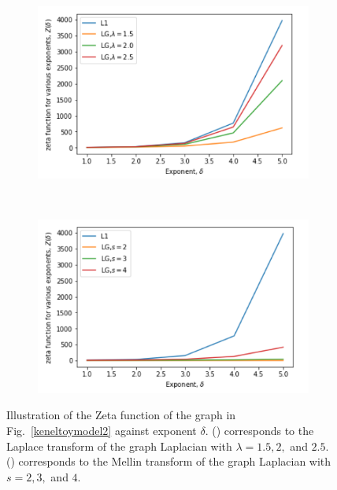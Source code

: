 \documentclass[10pt,a4paper]{article}
\begin{document}
      \begin{figure}[H]
      	\centering
      	\begin{subfigure}[b]{0.35\textwidth}
      		\includegraphics[width= \textwidth]{images/zeta-laplace2.png}
      		\caption{}
      		\label{zeta-laplace}
      	\end{subfigure}~
      	\begin{subfigure}[b]{0.35\textwidth}
      		\includegraphics[width= \textwidth]{images/zeta-mellin2.png}
      		\caption{}
      		\label{zeta-mellin}
      	\end{subfigure} 
      	\caption{Illustration of the Zeta function of the graph in Fig.~\ref{keneltoymodel2} against exponent $\delta$. () corresponds to the Laplace transform of the graph Laplacian with $\lambda = 1.5, 2,$ and $2.5$. () corresponds to the Mellin transform of the graph Laplacian with $s = 2, 3,$ and $4$. }
      	\label{}
      \end{figure}
	  
\end{document}
